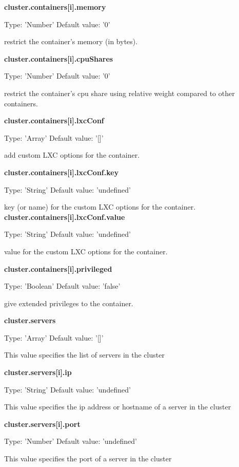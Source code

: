 \documentclass[a4paper,11pt,twoside]{report}
\begin{document}
\noindent
\textbf{cluster.containers[i].memory}

\noindent
Type: 'Number' Default value: '0'\smallskip

\noindent 
restrict the container's memory (in bytes).\bigskip

\noindent
\textbf{cluster.containers[i].cpuShares}

\noindent
Type: 'Number' Default value: '0'\smallskip

\noindent 
restrict the container's cpu share using relative weight compared to other containers.\bigskip

\noindent
\textbf{cluster.containers[i].lxcConf}

\noindent
Type: 'Array' Default value: '[]'\smallskip

\noindent 
add custom LXC options for the container.\bigskip

\noindent
\textbf{cluster.containers[i].lxcConf.key}

\noindent
Type: 'String' Default value: 'undefined'\smallskip

\noindent 
key (or name) for the custom LXC options for the container.\bigskip
\noindent
\textbf{cluster.containers[i].lxcConf.value}

\noindent
Type: 'String' Default value: 'undefined'\smallskip

\noindent 
value for the custom LXC options for the container.\bigskip

\noindent
\textbf{cluster.containers[i].privileged}

\noindent
Type: 'Boolean' Default value: 'false'\smallskip

\noindent 
give extended privileges to the container.\bigskip

\noindent
\textbf{cluster.servers}

\noindent
Type: 'Array'  Default value: '[]'\smallskip

\noindent
This value specifies the list of servers in the cluster\bigskip

\noindent
\textbf{cluster.servers[i].ip}

\noindent
Type: 'String' Default value: 'undefined'\smallskip

\noindent 
This value specifies the ip address or hostname of a server in the cluster\bigskip

\noindent
\textbf{cluster.servers[i].port}

\noindent
Type: 'Number' Default value: 'undefined'\smallskip

\noindent
This value specifies the port of a server in the cluster\bigskip
\end{document}
